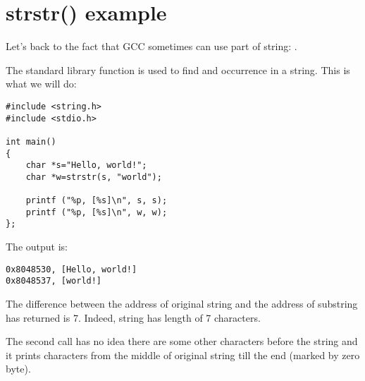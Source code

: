 \section{strstr() example}
\label{strstr_example}

Let's back to the fact that GCC sometimes can use part of string: .

The  \CCpp standard library function is used to find and occurrence in a string.
This is what we will do:

\begin{lstlisting}
#include <string.h>
#include <stdio.h>

int main()
{
	char *s="Hello, world!";
	char *w=strstr(s, "world");

	printf ("%p, [%s]\n", s, s);
	printf ("%p, [%s]\n", w, w);
};
\end{lstlisting}

The output is:

\begin{lstlisting}
0x8048530, [Hello, world!]
0x8048537, [world!]
\end{lstlisting}

The difference between the address of original string and the address of substring  has returned is 7.
Indeed,  string has length of 7 characters.

The second \printf call has no idea there are some other characters before the string and it prints characters
from the middle of original string till the end (marked by zero byte).

